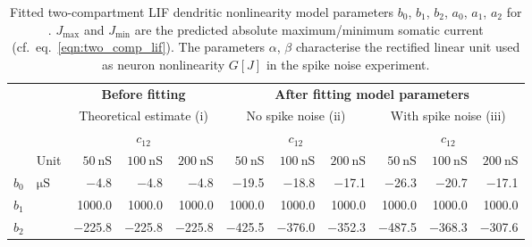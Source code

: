 
\begin{table}[p]
	\fontsize{10pt}{1.25}\selectfont
	\caption[Fitted two-compartment LIF dendritic nonlinearity model parameters]{Fitted two-compartment LIF dendritic nonlinearity model parameters $b_0$, $b_1$, $b_2$, $a_0$, $a_1$, $a_2$ for .
	$J_\mathrm{max}$ and $J_\mathrm{min}$ are the predicted absolute maximum/minimum somatic current (cf.~eq.~\ref{eqn:two_comp_lif}).
	The parameters $\alpha$, $\beta$ characterise the rectified linear unit used as neuron nonlinearity $G[J]$ in the spike noise experiment.}
	\renewcommand{\arraystretch}{1.2}
	\small
	\centering
	\sffamily
	\vspace{0.25cm}
	\begin{tabular}{l l   r r r   r r r   r r r}
		\toprule
			& & \multicolumn{3}{c}{\textbf{Before fitting}} & \multicolumn{6}{c}{\textbf{After fitting model parameters}} \\
		\cmidrule(l){3-5}
		\cmidrule(l){6-11}
		& & \multicolumn{3}{c}{Theoretical estimate (i)} &
		    \multicolumn{3}{c}{No spike noise (ii)} &
		    \multicolumn{3}{c}{With spike noise (iii)} \\
		\cmidrule(l){3-5}
		\cmidrule(l){6-8}
		\cmidrule(l){9-11}
		& & \multicolumn{3}{c}{$c_{12}$} &
		\multicolumn{3}{c}{$c_{12}$} &
		\multicolumn{3}{c}{$c_{12}$} \\
		& Unit &
		$\SI{50}{\nano\siemens}$ &
		$\SI{100}{\nano\siemens}$ &		
		$\SI{200}{\nano\siemens}$ &		
		$\SI{50}{\nano\siemens}$ &
		$\SI{100}{\nano\siemens}$ &
		$\SI{200}{\nano\siemens}$ &
		$\SI{50}{\nano\siemens}$ &
		$\SI{100}{\nano\siemens}$ &		
		$\SI{200}{\nano\siemens}$ \\
		\cmidrule(r){1-2}
		\cmidrule(l){3-5}
		\cmidrule(l){6-8}
		\cmidrule(l){9-11}

		$b_0$ & $\si{\micro\siemens}$ &
		\num{-4.8} & \num{-4.8} & \num{-4.8} &
		\num{-19.5} & \num{-18.8} & \num{-17.1} &
		\num{-26.3} & \num{-20.7} & \num{-17.1}
		\\

		$b_1$ & &
		\num{1000.0} & \num{1000.0} & \num{1000.0} &
		\num{1000.0} & \num{1000.0} & \num{1000.0} &
		\num{1000.0} & \num{1000.0} & \num{1000.0} \\

		$b_2$ & &
		\num{-225.8} & \num{-225.8} & \num{-225.8} &
		\num{-425.5} & \num{-376.0} & \num{-352.3} &
		\num{-487.5} & \num{-368.3} & \num{-307.6} \\


\end{tabular}
\end{table}
